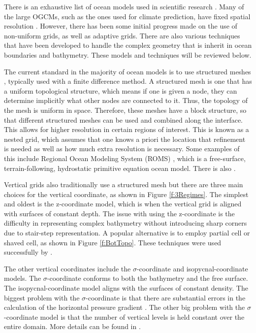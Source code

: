 There is an exhaustive list of ocean models used in scientific research \cite{oceanmodels}.  Many of the large OGCMs, such as the ones used for climate prediction, have fixed spatial resolution \cite{97JCCGMSTW, 00FBLMRRW, 00GCSBGJMW, 00PGRS, 93GMB, 93GMBD, 96RABCCDEGSS}.  However, there has been some initial progress made on the use of non-uniform grids, as well as adaptive grids.  There are also various techniques that have been developed to handle the complex geometry that is inherit in ocean boundaries and bathymetry.  These models and techniques will be reviewed below.  

The current standard in the majority of ocean models is to use structured meshes \cite{06CBBBB}, typically used with a finite difference method.  A structured mesh is one that has a uniform topological structure, which means if one is given a node, they can determine implicitly what other nodes are connected to it.  Thus, the topology of the mesh is uniform in space.  Therefore, these meshes have a block structure, so that different structured meshes can be used and combined along the interface.  This allows for higher resolution in certain regions of interest.  This is known as a nested grid, which assumes that one knows a priori the location that refinement is needed as well as how much extra resolution is necessary.  Some examples of this include Regional Ocean Modeling System (ROMS) \cite{05SM}, which is a free-surface, terrain-following, hydrostatic primitive equation ocean model.  There is also \cite{96LAM, 99LL}. 

Vertical grids also traditionally use a structured mesh but there are three main choices for the vertical coordinate, as shown in Figure \ref{f:3Regimes}.  The simplest and oldest is the z-coordinate model, which is when the vertical grid is aligned with surfaces of constant depth.  The issue with using the z-coordinate is the difficulty in representing complex bathymetry without introducing sharp corners due to stair-step representation.  A popular alternative is to employ partial cell or shaved cell, as shown in Figure \ref{f:BotTopo}.  These techniques were used successfully by \cite{97AHM}.  

The other vertical coordinates include the $\sigma$-coordinate and isopycnal-coordinate models.  The $\sigma$-coordinate conforms to both the bathymetry and the free surface.  The isopycnal-coordinate model aligns with the surfaces of constant density.  The biggest problem with the $\sigma$-coordinate is that there are substantial errors in the calculation of the horizontal pressure gradient \cite{98MOE}.  The other big problem with the $\sigma$-coordinate model is that the number of vertical levels is held constant over the entire domain.  More details can be found in \cite{99HB}.  

